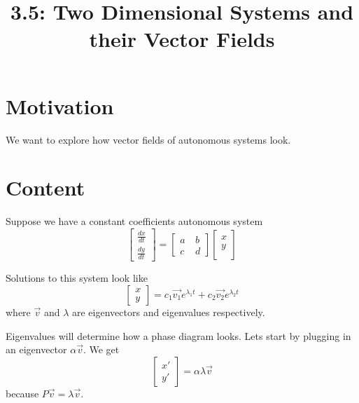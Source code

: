 \documentclass{article}
\title{3.5: Two Dimensional Systems and their Vector Fields}
\begin{document}
\maketitle
\section{Motivation}
We want to explore how vector fields of autonomous systems look.

\section{Content}
Suppose we have a constant coefficients autonomous system $$\begin{bmatrix}
    \frac{dx}{dt} \\[3pt] \frac{dy}{dt}
\end{bmatrix}= \begin{bmatrix}
    a &\: b \\[3pt] c &\: d
\end{bmatrix}\begin{bmatrix}
    x \\[3pt] y\\
\end{bmatrix}$$

Solutions to this system look like $$\begin{bmatrix}
    x \\y
\end{bmatrix} = c_1\vec{v_1}e^{\lambda_1 t} + c_2\vec{v_2}e^{\lambda_2 t}$$where $\vec{v}$ and $\lambda$ are eigenvectors and eigenvalues respectively.

Eigenvalues will determine how a phase diagram looks. Lets start by plugging in an eigenvector $\alpha \vec{v}$. We get $$\begin{bmatrix}
    x' \\ y'
\end{bmatrix} = \alpha\lambda \vec{v}$$because $P\vec{v} = \lambda\vec{v}$. 
\end{document}
